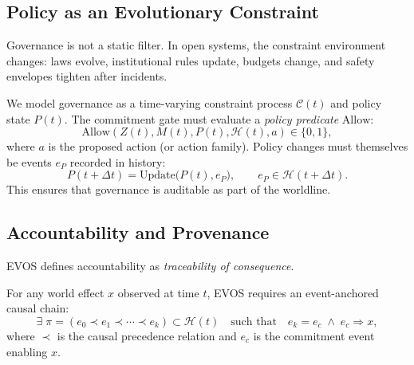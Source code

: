 \documentclass[11pt]{article}
\begin{document}
\subsection{Policy as an Evolutionary Constraint}
\label{sec:policy-evolutionary}

Governance is not a static filter. In open systems, the constraint environment changes:
laws evolve, institutional rules update, budgets change, and safety envelopes tighten after incidents.

We model governance as a time-varying constraint process $\mathcal{C}(t)$ and policy state $P(t)$.
The commitment gate must evaluate a \emph{policy predicate} $\mathrm{Allow}$:
\[
\mathrm{Allow}(Z(t),M(t),P(t),\mathcal{H}(t),a) \in \{0,1\},
\]
where $a$ is the proposed action (or action family). Policy changes must themselves be events
$e_P$ recorded in history:
\[
P(t+\Delta t) = \mathrm{Update}\big(P(t), e_P\big),\qquad e_P \in \mathcal{H}(t+\Delta t).
\]
This ensures that governance is auditable as part of the worldline.

\subsection{Accountability and Provenance}
\label{sec:accountability-provenance}

EVOS defines accountability as \emph{traceability of consequence}.

For any world effect $x$ observed at time $t$, EVOS requires an event-anchored causal chain:
\[
\exists \;\pi = (e_0 \prec e_1 \prec \cdots \prec e_k) \subset \mathcal{H}(t)
\quad\text{such that}\quad
e_k = e_c \;\land\; e_c \Rightarrow x,
\]
where $\prec$ is the causal precedence relation and $e_c$ is the commitment event enabling $x$.
\end{document}
